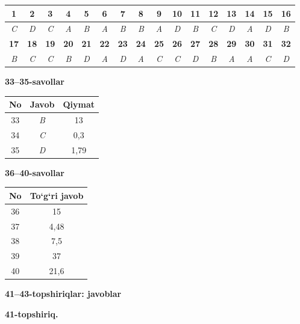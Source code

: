 \documentclass[11pt,a4paper]{article}
\begin{document}
\noindent\begin{tabular}{|c|c|c|c|c|c|c|c|c|c|c|c|c|c|c|c|}\hline
\textbf{1} & \textbf{2} & \textbf{3} & \textbf{4} & \textbf{5} & \textbf{6} & \textbf{7} & \textbf{8} & \textbf{9} & \textbf{10} & \textbf{11} & \textbf{12} & \textbf{13} & \textbf{14} & \textbf{15} & \textbf{16}\\\hline
\textsl{C} & \textsl{D} & \textsl{C} & \textsl{A} & \textsl{B} & \textsl{A} & \textsl{B} & \textsl{B} & \textsl{A} & \textsl{D} & \textsl{B} & \textsl{C} & \textsl{D} & \textsl{A} & \textsl{D} & \textsl{B}\\\hline
\textbf{17} & \textbf{18} & \textbf{19} & \textbf{20} & \textbf{21} & \textbf{22} & \textbf{23} & \textbf{24} & \textbf{25} & \textbf{26} & \textbf{27} & \textbf{28} & \textbf{29} & \textbf{30} & \textbf{31} & \textbf{32}\\\hline
\textsl{B} & \textsl{C} & \textsl{C} & \textsl{B} & \textsl{D} & \textsl{A} & \textsl{D} & \textsl{A} & \textsl{C} & \textsl{C} & \textsl{D} & \textsl{B} & \textsl{A} & \textsl{A} & \textsl{C} & \textsl{D}\\\hline
\end{tabular}\par\medskip
\noindent\textbf{33--35-savollar}\par\smallskip
\noindent\begin{tabular}{|c|c|c|}\hline \textbf{No} & \textbf{Javob} & \textbf{Qiymat}\\\hline
33 & \textsl{B} & 13\\\hline
34 & \textsl{C} & 0,3\\\hline
35 & \textsl{D} & 1,79\\\hline
\end{tabular}\par\medskip
\noindent\textbf{36--40-savollar}\par\smallskip
\noindent\begin{tabular}{|c|c|}\hline \textbf{No} & \textbf{To`g`ri javob}\\\hline
36 & 15\\\hline
37 & 4,48\\\hline
38 & 7,5\\\hline
39 & 37\\\hline
40 & 21,6\\\hline
\end{tabular}\par\medskip
\noindent\textbf{41--43-topshiriqlar: javoblar}\par\smallskip
\noindent\textbf{41-topshiriq.}\par
\end{document}
